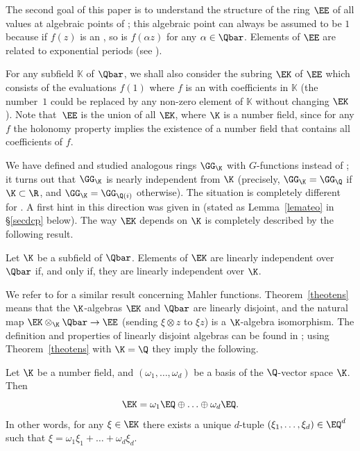 The second goal of this paper is to understand the structure of the ring $\EE $ of all values at algebraic points of \Efunctions; this algebraic point can always be assumed to be $1$ because if $f(z)$ is an \Efunction, so is $f(\alpha z)$ for any $\alpha\in \Qbar$. Elements of $\EE$ are related to exponential periods (see \cite[\S 4.3]{fuchsien}).

For any subfield $\mathbb K$ of $\Qbar$, we shall also consider the subring $\EK$ of $\EE$ which consists of the evaluations $f(1)$ where $f$ is an \Efunction with coefficients in $\mathbb K$ (the number~$1$ could be replaced by any non-zero element of $\mathbb K$ without changing $\EK$).
Note that~$\EE$ is the union of all $\EK$, where $\K$ is a number field, since for any \Efunction $f$ the holonomy property implies the existence of a number field that contains all coefficients of $f$.

We have defined and studied \cite{gvalues} analogous rings $\GG_\K$ with $G$-functions instead of \Efunctions; it turns out that $\GG_\K$ is nearly independent from $\K$ (precisely, $\GG_\K= \GG_\Q$ if $\K\subset\R$, and $\GG_\K=\GG_{\Q(i)}$ otherwise). The situation is completely different for \Efunctions. A first hint in this direction was given in \cite[Th.\,4]{ateo} (stated as Lemma~\ref{lemateo} in \S \ref{secdcp} below). The way $\EK$ depends on $\K$ is completely described by the following result.

\begin{theo} \label{theotens} Let $\K$ be a subfield of $\Qbar$.
Elements of $\EK$ are linearly independent over $\Qbar$ if, and only if, they are linearly independent over $\K$.
\end{theo}

We refer to \cite[Th.\,1.7]{AF} for a similar result concerning Mahler functions.
Theorem~\ref{theotens} means that the $\K$-algebras $\EK$ and $\Qbar$ are linearly disjoint, and the natural map $\EK\otimes_\K \Qbar \to \EE $ (sending $\xi\otimes z$ to $\xi z$) is a $\K$-algebra isomorphism.
The definition and properties of linearly disjoint algebras can be found in \cite[Ch.\,V, \S 2, No.\,5]{Bourbaki}; using Theorem~\ref{theotens} with $\K=\Q$ they imply the following.

\begin{coro}\label{cordcp}
Let $\K$ be a number field, and $(\omega_1,\ldots,\omega_d)$ be a basis of the $\Q$-vector space $\K$. Then
\[
\EK = \omega_1 \EQ\oplus \ldots \oplus \omega_d \EQ.
\]
In other words, for any $\xi\in\EK$
there exists a unique $d$-tuple $(\xi_1,\ldots,\xi_d)\in\EQ^d$ such that $\xi = \omega_1\xi_1+\ldots+\omega_d\xi_d$.
\end{coro}

